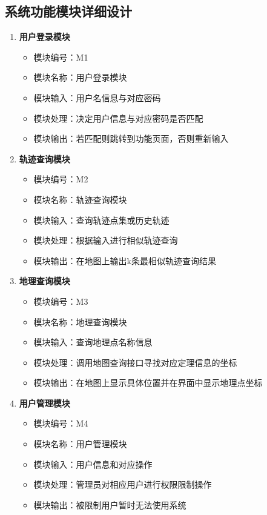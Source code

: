 \subsection{系统功能模块详细设计}
\label{subsec:system module details description}

\begin{enumerate}
	\item \textbf{用户登录模块}
	\begin{itemize}
		\item 模块编号：M1
		\item 模块名称：用户登录模块
		\item 模块输入：用户名信息与对应密码
		\item 模块处理：决定用户信息与对应密码是否匹配
		\item 模块输出：若匹配则跳转到功能页面，否则重新输入
	\end{itemize}
	
	\item \textbf{轨迹查询模块}
	\begin{itemize}
		\item 模块编号：M2
		\item 模块名称：轨迹查询模块
		\item 模块输入：查询轨迹点集或历史轨迹
		\item 模块处理：根据输入进行相似轨迹查询
		\item 模块输出：在地图上输出k条最相似轨迹查询结果
	\end{itemize}
	
	\item \textbf{地理查询模块}
	\begin{itemize}
		\item 模块编号：M3
		\item 模块名称：地理查询模块
		\item 模块输入：查询地理点名称信息
		\item 模块处理：调用地图查询接口寻找对应定理信息的坐标
		\item 模块输出：在地图上显示具体位置并在界面中显示地理点坐标
	\end{itemize}
	
	\item \textbf{用户管理模块}
	\begin{itemize}
		\item 模块编号：M4
		\item 模块名称：用户管理模块
		\item 模块输入：用户信息和对应操作
		\item 模块处理：管理员对相应用户进行权限限制操作
		\item 模块输出：被限制用户暂时无法使用系统
	\end{itemize}
	

\end{enumerate}
